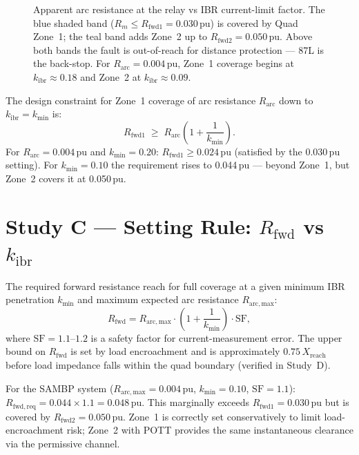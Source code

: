 \documentclass[11pt,a4paper]{article}
\begin{document}
\begin{figure}[htbp]
  \centering
  \resizebox{0.88\textwidth}{!}{%
  }
  \caption{Apparent arc resistance at the relay vs IBR current-limit factor.
           The blue shaded band ($R_m \leq R_\mathrm{fwd1}=0.030$\,pu) is
           covered by Quad Zone~1; the teal band adds Zone~2 up to
           $R_\mathrm{fwd2}=0.050$\,pu.  Above both bands the fault is
           out-of-reach for distance protection --- 87L is the back-stop.
           For $R_\mathrm{arc}=0.004$\,pu, Zone~1 coverage begins at
           $k_\mathrm{ibr}\approx0.18$ and Zone~2 at $k_\mathrm{ibr}\approx0.09$.}
  \label{fig:infeed}
\end{figure}

The design constraint for Zone~1 coverage of arc resistance $R_\mathrm{arc}$ down
to $k_\mathrm{ibr}=k_\mathrm{min}$ is:
\begin{equation}
  R_\mathrm{fwd1} \;\geq\; R_\mathrm{arc}\!\left(1 + \frac{1}{k_\mathrm{min}}\right).
  \label{eq:rfwd_design}
\end{equation}
For $R_\mathrm{arc}=0.004$\,pu and $k_\mathrm{min}=0.20$: $R_\mathrm{fwd1}\geq0.024$\,pu
(satisfied by the 0.030\,pu setting).  For $k_\mathrm{min}=0.10$ the requirement
rises to 0.044\,pu --- beyond Zone~1, but Zone~2 covers it at 0.050\,pu.

\section{Study C --- Setting Rule: $R_\mathrm{fwd}$ vs $k_\mathrm{ibr}$}
\label{sec:studyC}

The required forward resistance reach for full coverage at a given minimum IBR
penetration $k_\mathrm{min}$ and maximum expected arc resistance
$R_\mathrm{arc,max}$:
\begin{equation}
  R_\mathrm{fwd} = R_\mathrm{arc,max} \cdot \left(1 + \frac{1}{k_\mathrm{min}}\right)
  \cdot \mathrm{SF},
  \label{eq:rfwd_rule}
\end{equation}
where $\mathrm{SF}=1.1$--$1.2$ is a safety factor for current-measurement error.
The upper bound on $R_\mathrm{fwd}$ is set by load encroachment and is
approximately $0.75\,X_\mathrm{reach}$ before load impedance falls within the
quad boundary (verified in Study~D).

For the SAMBP system ($R_\mathrm{arc,max}=0.004$\,pu, $k_\mathrm{min}=0.10$,
$\mathrm{SF}=1.1$): $R_\mathrm{fwd,req}=0.044\times1.1=0.048$\,pu.  This
marginally exceeds $R_\mathrm{fwd1}=0.030$\,pu but is covered by
$R_\mathrm{fwd2}=0.050$\,pu.  Zone~1 is correctly set conservatively to limit
load-encroachment risk; Zone~2 with POTT provides the same instantaneous
clearance via the permissive channel.
\end{document}
